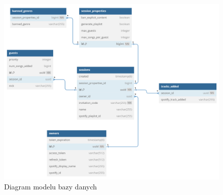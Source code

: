 \begin{figure}[h]
\centering
\includegraphics[width=1.0\textwidth]{./graf/database_diagram.png}
\caption{Diagram modelu bazy danych}
\label{fig:database}
\end{figure}



